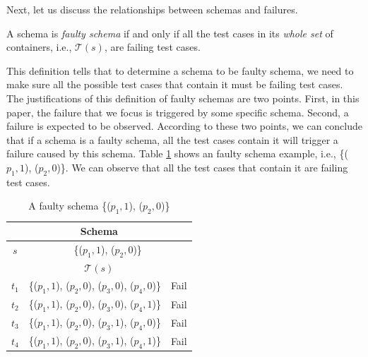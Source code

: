 

Next, let us discuss the relationships between schemas and failures.

\begin{definition}\label{de:faulty}
A schema is \emph{faulty schema} if and only if all the test cases in its \emph{whole set} of containers, i.e., $\mathcal{T}(s)$, are failing test cases.
\end{definition}

This definition tells that to determine a schema to be faulty schema, we need to make sure all the possible test cases that contain it must be failing test cases. The justifications of this definition of faulty schemas are two points. First, in this paper, the failure that we focus is triggered by some specific schema. Second, a failure is expected to be observed. According to these two points, we can conclude that if a schema is a faulty schema, all the test cases contain it will trigger a failure caused by this schema.  Table \ref{ex:faultyshema} shows an faulty schema example, i.e., \{($p_{1}, 1$), ($p_{2}, 0$)\}. We can observe that all the test cases that contain it are failing test cases.

\begin{table}[htbp]
  \centering
  \caption{A faulty schema \{($p_{1}, 1$), ($p_{2}, 0$)\}}
  \label{ex:faultyshema}
    \begin{tabular}{|c|c|c|}\hline
  \multicolumn{3}{|c|}{ \textbf{Schema}} \\ \hline
   $s$ &   \multicolumn{2}{|c|}{\{($p_{1}, 1$), ($p_{2}, 0$)\} } \\ \hline
  \multicolumn{3}{|c|}{ \textbf{ $\mathcal{T}(s)$ }}\\ \hline
    $t_{1}$ &   \{($p_{1}, 1$), ($p_{2}, 0$), ($p_{3}, 0$), ($p_{4}, 0$)\} & Fail \\
    $t_{2}$ &   \{($p_{1}, 1$), ($p_{2}, 0$), ($p_{3}, 0$), ($p_{4}, 1$)\} & Fail \\
    $t_{3}$ &   \{($p_{1}, 1$), ($p_{2}, 0$), ($p_{3}, 1$), ($p_{4}, 0$)\} & Fail \\
    $t_{4}$ &   \{($p_{1}, 1$), ($p_{2}, 0$), ($p_{3}, 1$), ($p_{4}, 1$)\} & Fail \\ \hline
    \end{tabular}
\end{table}%

